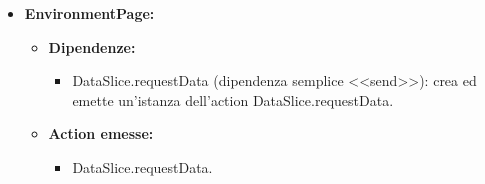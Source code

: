 \begin{itemize}
    \item \textbf{EnvironmentPage:}
          \begin{itemize}
              \item \textbf{Dipendenze:}
                    \begin{itemize}
                        \item DataSlice.requestData (dipendenza semplice <<send>>): crea ed emette un'istanza
                              dell'action DataSlice.requestData.
                    \end{itemize}
              \item \textbf{Action emesse:}
                    \begin{itemize}
                        \item DataSlice.requestData.
                    \end{itemize}
          \end{itemize}
\end{itemize}

\pagebreak

